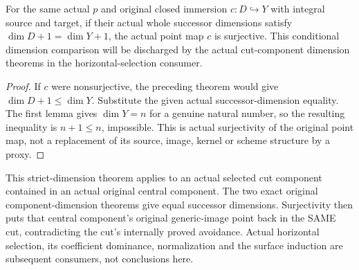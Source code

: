 \begin{corollary}
\label{cor:pl-gauss-original-equal-successor-dimensions-surjective}
\leanok
For the same actual $p$ and original closed immersion $c:D\hookrightarrow Y$
with integral source and target, if their actual whole successor dimensions
satisfy $\dim D+1=\dim Y+1$, the actual point map $c$ is surjective.
This conditional dimension comparison will be discharged by the actual
cut-component dimension theorems in the horizontal-selection consumer.
\end{corollary}
\begin{proof}
If $c$ were nonsurjective, the preceding theorem would give
$\dim D+1\le\dim Y$. Substitute the given actual successor-dimension
equality. The first lemma gives $\dim Y=n$ for a genuine natural number,
so the resulting inequality is $n+1\le n$, impossible. This is actual
surjectivity of the original point map, not a replacement of its source,
image, kernel or scheme structure by a proxy.
\end{proof}

This strict-dimension theorem applies to an actual selected cut component
contained in an actual original central component. The two exact original
component-dimension theorems give equal successor dimensions. Surjectivity
then puts that central component's original generic-image point back in
the SAME cut, contradicting the cut's internally proved avoidance. Actual
horizontal selection, its coefficient dominance, normalization and the
surface induction are subsequent consumers, not conclusions here.
